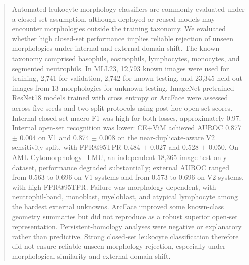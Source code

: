 \begin{abstract}
Automated leukocyte morphology classifiers are commonly evaluated under a closed-set assumption, although deployed or reused models may encounter morphologies outside the training taxonomy. We evaluated whether high closed-set performance implies reliable rejection of unseen morphologies under internal and external domain shift. The known taxonomy comprised basophils, eosinophils, lymphocytes, monocytes, and segmented neutrophils. In MLL23, 12,793 known images were used for training, 2,741 for validation, 2,742 for known testing, and 23,345 held-out images from 13 morphologies for unknown testing. ImageNet-pretrained ResNet18 models trained with cross entropy or ArcFace were assessed across five seeds and two split protocols using post-hoc open-set scores. Internal closed-set macro-F1 was high for both losses, approximately 0.97. Internal open-set recognition was lower: CE+ViM achieved AUROC 0.877 $\pm$ 0.004 on V1 and 0.874 $\pm$ 0.008 on the near-duplicate-aware V2 sensitivity split, with FPR@95TPR 0.484 $\pm$ 0.027 and 0.528 $\pm$ 0.050. On AML-Cytomorphology\_LMU, an independent 18,365-image test-only dataset, performance degraded substantially; external AUROC ranged from 0.563 to 0.696 on V1 systems and from 0.573 to 0.696 on V2 systems, with high FPR@95TPR. Failure was morphology-dependent, with neutrophil-band, monoblast, myeloblast, and atypical lymphocyte among the hardest external unknowns. ArcFace improved some known-class geometry summaries but did not reproduce as a robust superior open-set representation. Persistent-homology analyses were negative or explanatory rather than predictive. Strong closed-set leukocyte classification therefore did not ensure reliable unseen-morphology rejection, especially under morphological similarity and external domain shift.
\end{abstract}

